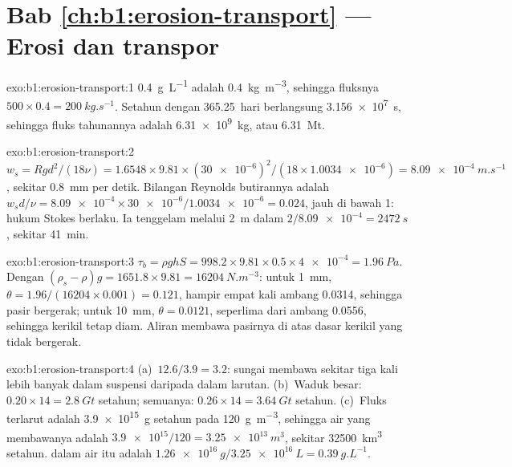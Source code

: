 \section*{Bab \ref{ch:b1:erosion-transport} --- Erosi dan transpor}

\begin{solution}{exo:b1:erosion-transport:1}
\qty{0.4}{g.L^{-1}} adalah \qty{0.4}{kg.m^{-3}}, sehingga fluksnya $500 \times 0.4 =
\qty{200}{kg.s^{-1}}$. Setahun dengan \num{365.25}~hari berlangsung
\qty{3.156e7}{s}, sehingga fluks tahunannya adalah \qty{6.31e9}{kg}, atau
\qty{6.31}{Mt}.
\end{solution}

\begin{solution}{exo:b1:erosion-transport:2}
$w_s = R g d^2/(18\nu) = 1.6548 \times 9.81 \times (\num{30e-6})^2/(18 \times
\num{1.0034e-6}) = \qty{8.09e-4}{m.s^{-1}}$, sekitar \qty{0.8}{mm} per detik. Bilangan
Reynolds butirannya adalah $w_s d/\nu = \num{8.09e-4} \times
\num{30e-6}/\num{1.0034e-6} = 0.024$, jauh di bawah 1: hukum Stokes berlaku. Ia
tenggelam melalui \qty{2}{m} dalam $2/\num{8.09e-4} = \qty{2472}{s}$, sekitar
\qty{41}{min}.
\end{solution}

\begin{solution}{exo:b1:erosion-transport:3}
$\tau_b = \rho g h S = 998.2 \times 9.81 \times 0.5 \times \num{4e-4} =
\qty{1.96}{Pa}$. Dengan $(\rho_s - \rho) g = 1651.8 \times 9.81 =
\qty{16204}{N.m^{-3}}$: untuk \qty{1}{mm}, $\theta = 1.96/(16204 \times 0.001) =
0.121$, hampir empat kali ambang \num{0.0314}, sehingga pasir bergerak; untuk
\qty{10}{mm}, $\theta = 0.0121$, seperlima dari ambang \num{0.0556}, sehingga
kerikil tetap diam. Aliran membawa pasirnya di atas dasar kerikil yang tidak bergerak.
\end{solution}

\begin{solution}{exo:b1:erosion-transport:4}
(a)~$12.6/3.9 = 3.2$: sungai membawa sekitar tiga kali lebih banyak dalam suspensi
daripada dalam larutan. (b)~Waduk besar: $0.20 \times 14 = \qty{2.8}{Gt}$ setahun;
semuanya: $0.26 \times 14 = \qty{3.64}{Gt}$ setahun. (c)~Fluks terlarut adalah
\qty{3.9e15}{g} setahun pada \qty{120}{g.m^{-3}}, sehingga air yang membawanya adalah
$\num{3.9e15}/120 = \qty{3.25e13}{m^3}$, sekitar \qty{32500}{km^3} setahun.  dalam air itu adalah $\qty{1.26e16}{g}/\qty{3.25e16}{L} =
\qty{0.39}{g.L^{-1}}$.
\end{solution}

